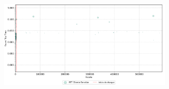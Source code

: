 \begin{apendicesenv}
\begin{figure}[htbp!]
\begin{subfigure}[t]{0.5\textwidth}
        \includegraphics[width=1\textwidth, height=120pt]{USPSC-img/output/cropped/1-dos_hping3-rttp.png}
    \end{subfigure}%
\end{figure}


\end{apendicesenv}
